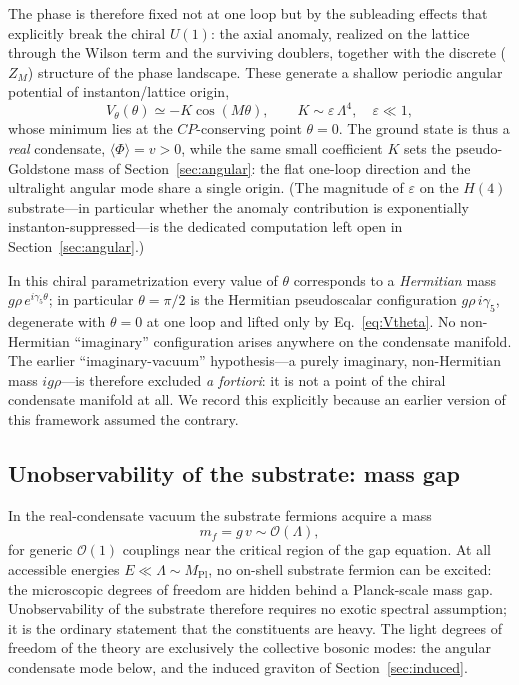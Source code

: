 \documentclass[11pt,a4paper]{article}
\begin{document}
The phase is therefore fixed not at one loop but by the subleading
effects that explicitly break the chiral $U(1)$: the axial anomaly,
realized on the lattice through the Wilson term and the surviving
doublers, together with the discrete ($Z_M$) structure of the phase
landscape.  These generate a shallow periodic angular potential of
instanton/lattice origin,
\begin{equation}
V_\theta(\theta) \simeq -K\cos(M\theta),
\qquad K \sim \varepsilon\,\Lambda^4,\quad \varepsilon \ll 1,
\label{eq:Vtheta}
\end{equation}
whose minimum lies at the $CP$-conserving point $\theta = 0$.  The
ground state is thus a \emph{real} condensate,
$\langle\Phi\rangle = v > 0$, while the same small coefficient $K$
sets the pseudo-Goldstone mass of Section~\ref{sec:angular}: the
flat one-loop direction and the ultralight angular mode share a
single origin.  (The magnitude of $\varepsilon$ on the $H(4)$
substrate---in particular whether the anomaly contribution is
exponentially instanton-suppressed---is the dedicated computation
left open in Section~\ref{sec:angular}.)

In this chiral parametrization every value of $\theta$ corresponds
to a \emph{Hermitian} mass $g\rho\,e^{i\gamma_5\theta}$; in
particular $\theta = \pi/2$ is the Hermitian pseudoscalar
configuration $g\rho\,i\gamma_5$, degenerate with $\theta = 0$ at one
loop and lifted only by Eq.~\eqref{eq:Vtheta}.  No non-Hermitian
``imaginary'' configuration arises anywhere on the condensate
manifold.  The earlier ``imaginary-vacuum'' hypothesis---a purely
imaginary, non-Hermitian mass $ig\rho$---is therefore excluded
\emph{a fortiori}: it is not a point of the chiral condensate
manifold at all.  We record this explicitly because an earlier
version of this framework assumed the contrary.

\subsection{Unobservability of the substrate: mass gap}
\label{sec:gap}

In the real-condensate vacuum the substrate fermions acquire a mass
\begin{equation}
m_f = g\,v \sim \mathcal{O}(\Lambda),
\label{eq:mf}
\end{equation}
for generic $\mathcal{O}(1)$ couplings near the critical region of
the gap equation.
At all accessible energies $E \ll \Lambda \sim M_{\mathrm{Pl}}$,
no on-shell substrate fermion can be excited: the microscopic
degrees of freedom are hidden behind a Planck-scale mass gap.
Unobservability of the substrate therefore requires no exotic
spectral assumption; it is the ordinary statement that the
constituents are heavy.
The light degrees of freedom of the theory are exclusively the
collective bosonic modes: the angular condensate mode below, and
the induced graviton of Section~\ref{sec:induced}.
\end{document}
